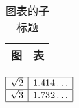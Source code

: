 \begin{table}
\caption{图表的子标题}
\parbox[b]{.5\textwidth}{\centering
  \begin{tabular}{|c|c|}
    \hline 图 & 表 \\ \hline
  \end{tabular}
  }%
\parbox[b]{.5\textwidth}{\centering
  $\begin{array}{|c|c|}
    \hline \sqrt{2} & 1.414\dots \\ \hline
    \sqrt{3} & 1.732\dots \\ \hline
  \end{array}$
  }
\end{table}
